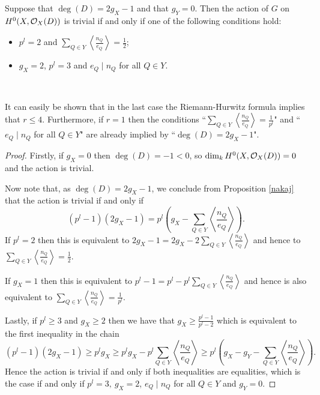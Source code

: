  \begin{cor}
    Suppose that $\deg(D)= 2g_X-1$ and that $g_Y=0$. Then the action of $G$ on $H^0(X,{\cal O}_X(D))$ is trivial if and only if one of the following conditions hold:
      \begin{itemize}
	\item  $p^l=2$ and $\sum_{Q\in Y}\left\langle\frac{n_Q}{e_Q}\right\rangle=\frac{1}{2}$;
	\item  $g_X=2$, $p^l=3$ and $e_Q\mid n_Q$ for all $Q\in Y$.
      \end{itemize}
  \end{cor}~


  \begin{rem}
    It can easily be shown that in the last case the Riemann-Hurwitz formula implies that $r\leq 4$. 
    Furthermore, if $r=1$ then the conditions ``$\sum_{Q\in Y}\left\langle\frac{n_Q}{e_Q}\right\rangle=\frac{1}{p^l}$" and ``$e_Q\mid n_Q$ for all $Q\in Y$" are already implied by ``$\deg(D)=2g_X-1$".
  \end{rem}

  \begin{proof}
    Firstly, if $g_X=0$ then $\deg(D)=-1<0$, so $\dim_kH^0(X,{\cal O}_X(D))=0$ and the action is trivial.

    Now note that, as $\deg(D)=2g_X-1$, we conclude from Proposition \ref{nakaj} that the action is trivial if and only if 
      \begin{equation*}
	(p^l-1)(2g_X-1)=p^l\left(g_X-\sum_{Q\in Y}\left\langle\frac{n_Q}{e_Q}\right\rangle\right).
      \end{equation*}
    If $p^l=2$ then this is equivalent to $2g_X-1=2g_X-2\sum_{Q\in Y}\left\langle\frac{n_Q}{e_Q}\right\rangle$ and hence to $\sum_{Q\in Y}\left\langle\frac{n_Q}{e_Q}\right\rangle=\frac{1}{2}$.

    If $g_X=1$ then this is equivalent to $p^l-1=p^l-p^l\sum_{Q\in Y}\left\langle\frac{n_Q}{e_Q}\right\rangle$ and hence is also equivalent to $\sum_{Q\in Y}\left\langle\frac{n_Q}{e_Q}\right\rangle=\frac{1}{p^l}$.

    Lastly, if $p^l\geq 3$ and $g_X\geq 2$ then we have that $g_X\geq \frac{p^l-1}{p^l-2}$ which is equivalent to the first inequality in the chain
      \begin{equation*}
	(p^l-1)(2g_X-1)\geq p^lg_X\geq p^lg_X-p^l\sum_{Q\in Y}\left\langle\frac{n_Q}{e_Q}\right\rangle \geq p^l\left( g_X - g_Y -\sum_{Q\in Y} \left\langle \frac{n_Q}{e_Q} \right\rangle \right).
      \end{equation*}
    Hence the action is trivial if and only if both inequalities are equalities, which is the case if and only if $p^l=3,\ g_X=2$, $e_Q\mid n_Q$ for all $Q\in Y$ and $g_Y = 0$.
  \end{proof}

